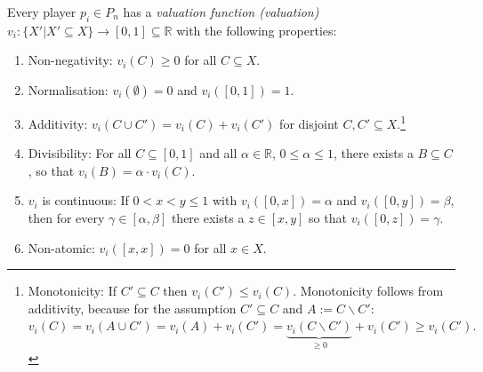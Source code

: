 Every player $p_i\in P_n$ has a \emph{valuation function (valuation)} $v_i:\{X'|X' \subseteq X\} \rightarrow [0,1]\subseteq \mathbb{R}$ with the following properties:
\begin{enumerate}
\item Non-negativity: $v_i(C)\geq 0$ for all $C\subseteq X.$
\item Normalisation: $v_i(\emptyset)=0$ and $v_i([0,1])=1.$
\item Additivity: $v_i(C \cup C')=v_i(C)+v_i(C')$ for disjoint
$C,C'\subseteq X.$\footnote{Monotonicity: If $C' \subseteq C$ then $v_i(C') \leq v_i(C)$. Monotonicity follows from additivity, because for the assumption $C' \subseteq C$ and $A:=C\backslash C'$: $v_i(C)=v_i(A\cup C')=v_i(A)+v_i(C')=\underbrace{v_i(C\backslash C')}_{\geq 0}+v_i(C')\geq v_i(C').$}
\item Divisibility: For all $C\subseteq [0,1]$ and all $\alpha \in
\mathbb{R}$, $0\leq \alpha \leq 1$, there exists a $B\subseteq C$, so that
$v_i(B)=\alpha \cdot v_i(C).$
\item  $v_i$ is continuous: If $0<x<y\leq 1$ with $v_i([0,x])=\alpha$ and
$v_i([0,y])=\beta$, then for every $\gamma \in [\alpha,\beta]$ there exists a $z \in [x,y]$ so that $v_i([0,z])=\gamma.$
\item Non-atomic:  $v_i([x,x])=0$ for all $x\in X.$
\end{enumerate}
